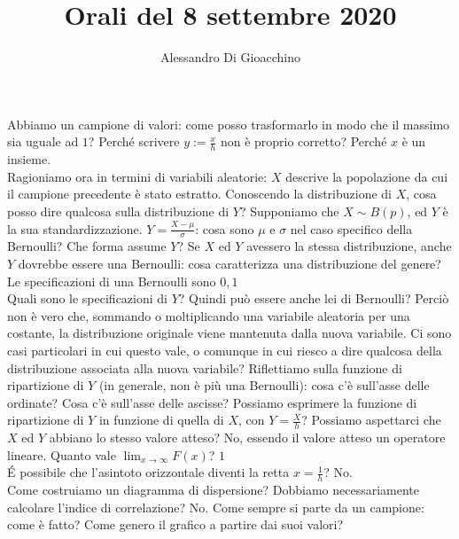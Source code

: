 \documentclass{article}
\title{Orali del 8 settembre 2020}
\author{Alessandro Di Gioacchino}
\begin{document}
    \maketitle
    
    Abbiamo un campione di valori: come posso trasformarlo in modo che il massimo sia uguale ad $ 1 $? Perché scrivere $ y := \frac{x}{h} $ non è proprio corretto? Perché
    $ x $ è un insieme. \\
    Ragioniamo ora in termini di variabili aleatorie: $ X $ descrive la popolazione da cui il campione precedente è stato estratto. Conoscendo la distribuzione di $ X $, cosa
    posso dire qualcosa sulla distribuzione di $ Y $? Supponiamo che $ X \sim B(p) $, ed $ Y $ è la sua standardizzazione. $ Y = \frac{X - \mu}{\sigma} $: cosa sono $ \mu $ e
    $ \sigma $ nel caso specifico della Bernoulli? Che forma assume $ Y $? Se $ X $ ed $ Y $ avessero la stessa distribuzione, anche $ Y $ dovrebbe essere una Bernoulli: cosa
    caratterizza una distribuzione del genere? Le specificazioni di una Bernoulli sono $ 0, 1 $ \\
    Quali sono le specificazioni di $ Y $? Quindi può essere anche lei di Bernoulli? Perciò non è vero che, sommando o moltiplicando una variabile aleatoria per una costante,
    la distribuzione originale viene mantenuta dalla nuova variabile. Ci sono casi particolari in cui questo vale, o comunque in cui riesco a dire qualcosa della distribuzione
    associata alla nuova variabile? Riflettiamo sulla funzione di ripartizione di $ Y $ (in generale, non è più una Bernoulli): cosa c'è sull'asse delle ordinate? Cosa c'è
    sull'asse delle ascisse? Possiamo esprimere la funzione di ripartizione di $ Y $ in funzione di quella di $ X $, con $ Y = \frac{X}{h} $? Possiamo aspettarci che $ X $ ed
    $ Y $ abbiano lo stesso valore atteso? No, essendo il valore atteso un operatore lineare. Quanto vale $ \lim_{x \to \infty} F(x) $? $ 1 $ \\
    É possibile che l'asintoto orizzontale diventi la retta $ x = \frac{1}{h} $? No. \\
    Come costruiamo un diagramma di dispersione? Dobbiamo necessariamente calcolare l'indice di correlazione? No. Come sempre si parte da un campione: come è fatto? Come
    genero il grafico a partire dai suoi valori? \\
    
\end{document}
